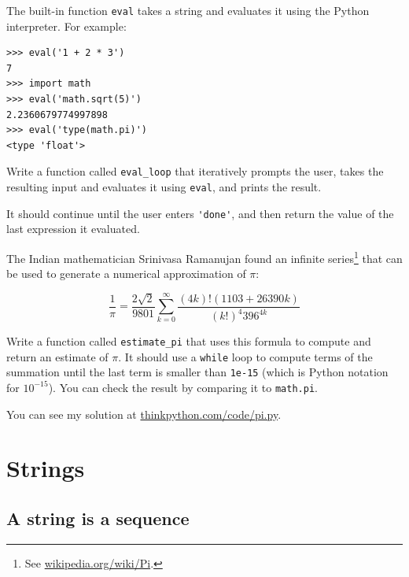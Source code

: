 \documentclass[10pt]{book}
\begin{document}
\begin{ex}


The built-in function {\tt eval} takes a string and evaluates
it using the Python interpreter.  For example:

\beforeverb
\begin{verbatim}
>>> eval('1 + 2 * 3')
7
>>> import math
>>> eval('math.sqrt(5)')
2.2360679774997898
>>> eval('type(math.pi)')
<type 'float'>
\end{verbatim}
\afterverb
%
Write a function called \verb"eval_loop" that iteratively
prompts the user, takes the resulting input and evaluates
it using {\tt eval}, and prints the result.

It should continue until the user enters \verb"'done'", and then
return the value of the last expression it evaluated.

\end{ex}


\begin{ex}


The Indian mathematician Srinivasa Ramanujan found an
infinite series\footnote{See \url{wikipedia.org/wiki/Pi}.}
that can be used to generate a numerical
approximation of $\pi$:


\[\frac{1}{\pi} = \frac{2\sqrt{2}}{9801} 
\sum^\infty_{k=0} \frac{(4k)!(1103+26390k)}{(k!)^4 396^{4k}} \]

Write a function called \verb"estimate_pi" that uses this formula
to compute and return an estimate of $\pi$.  It should use a {\tt while}
loop to compute terms of the summation until the last term is
smaller than {\tt 1e-15} (which is Python notation for $10^{-15}$).
You can check the result by comparing it to {\tt math.pi}.

You can see my solution at \url{thinkpython.com/code/pi.py}.
\end{ex}


\chapter{Strings}
\label{strings}


\section{A string is a sequence}
\end{document}
